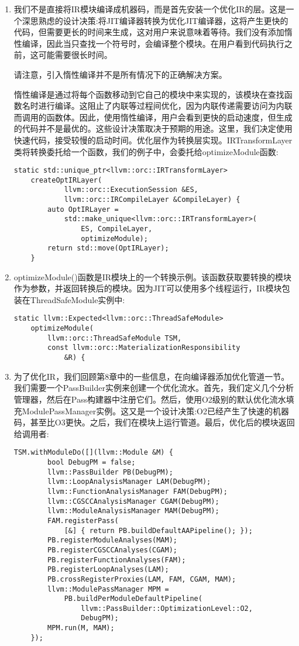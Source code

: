 \begin{enumerate}
\item 我们不是直接将IR模块编译成机器码，而是首先安装一个优化IR的层。这是一个深思熟虑的设计决策:将JIT编译器转换为优化JIT编译器，这将产生更快的代码，但需要更长的时间来生成，这对用户来说意味着等待。我们没有添加惰性编译，因此当只查找一个符号时，会编译整个模块。在用户看到代码执行之前，这可能需要很长时间。

\begin{tcolorbox}[colback=blue!5!white,colframe=blue!75!black, title=Note]
请注意，引入惰性编译并不是所有情况下的正确解决方案。
\end{tcolorbox}

惰性编译是通过将每个函数移动到它自己的模块中来实现的，该模块在查找函数名时进行编译。这阻止了内联等过程间优化，因为内联传递需要访问为内联而调用的函数体。因此，使用惰性编译，用户会看到更快的启动速度，但生成的代码并不是最优的。这些设计决策取决于预期的用途。这里，我们决定使用快速代码，接受较慢的启动时间。优化层作为转换层实现。IRTransformLayer类将转换委托给一个函数，我们的例子中，会委托给optimizeModule函数:
\begin{lstlisting}[caption={}]
	static std::unique_ptr<llvm::orc::IRTransformLayer>
	createOptIRLayer(
			llvm::orc::ExecutionSession &ES,
			llvm::orc::IRCompileLayer &CompileLayer) {
		auto OptIRLayer =
			std::make_unique<llvm::orc::IRTransformLayer>(
				ES, CompileLayer,
				optimizeModule);
		return std::move(OptIRLayer);
	}
\end{lstlisting}

\item optimizeModule()函数是IR模块上的一个转换示例。该函数获取要转换的模块作为参数，并返回转换后的模块。因为JIT可以使用多个线程运行，IR模块包装在ThreadSafeModule实例中:
\begin{lstlisting}[caption={}]
	static llvm::Expected<llvm::orc::ThreadSafeModule>
	optimizeModule(
		llvm::orc::ThreadSafeModule TSM,
		const llvm::orc::MaterializationResponsibility
			&R) {
\end{lstlisting}

\item 为了优化IR，我们回顾第8章中的一些信息，在向编译器添加优化管道一节。我们需要一个PassBuilder实例来创建一个优化流水。首先，我们定义几个分析管理器，然后在Pass构建器中注册它们。然后，使用O2级别的默认优化流水填充ModulePassManager实例。这又是一个设计决策:O2已经产生了快速的机器码，甚至比O3更快。之后，我们在模块上运行管道。最后，优化后的模块返回给调用者:
\begin{lstlisting}[caption={}]
	TSM.withModuleDo([](llvm::Module &M) {
		bool DebugPM = false;
		llvm::PassBuilder PB(DebugPM);
		llvm::LoopAnalysisManager LAM(DebugPM);
		llvm::FunctionAnalysisManager FAM(DebugPM);
		llvm::CGSCCAnalysisManager CGAM(DebugPM);
		llvm::ModuleAnalysisManager MAM(DebugPM);
		FAM.registerPass(
			[&] { return PB.buildDefaultAAPipeline(); });
		PB.registerModuleAnalyses(MAM);
		PB.registerCGSCCAnalyses(CGAM);
		PB.registerFunctionAnalyses(FAM);
		PB.registerLoopAnalyses(LAM);
		PB.crossRegisterProxies(LAM, FAM, CGAM, MAM);
		llvm::ModulePassManager MPM =
			PB.buildPerModuleDefaultPipeline(
				llvm::PassBuilder::OptimizationLevel::O2,
				DebugPM);
		MPM.run(M, MAM);
	});


\end{lstlisting}
\end{enumerate}
